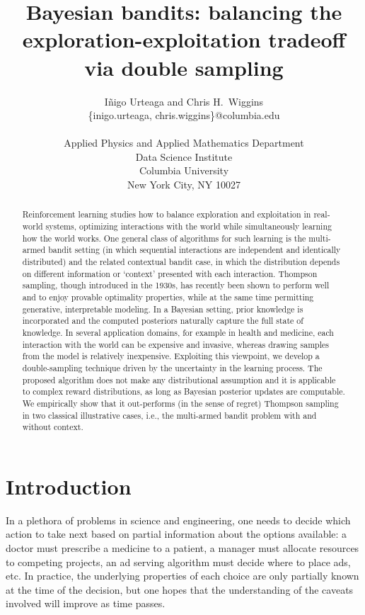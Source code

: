 \documentclass[10pt]{article}
\title{Bayesian bandits: balancing the exploration-exploitation tradeoff via double sampling}
\author{ I\~{n}igo Urteaga and Chris H.~Wiggins\\
	{\sf \{inigo.urteaga, chris.wiggins\}@columbia.edu} \\\\
	Applied Physics and Applied Mathematics Department\\
	Data Science Institute\\
	Columbia University\\
	New York City, NY 10027
}
\newcommand{\ie}{i.e., }
\begin{document}
\maketitle

\begin{abstract}
Reinforcement learning studies how to balance exploration and exploitation in real-world systems, optimizing interactions with the world while simultaneously learning how the world works. One general class of algorithms for such learning is the multi-armed bandit setting (in which sequential interactions are independent and identically distributed) and the related contextual bandit case, in which the distribution depends on different information or `context' presented with each interaction. Thompson sampling, though introduced in the 1930s, has recently been shown to perform well and to enjoy provable optimality properties, while at the same time permitting generative, interpretable modeling. In a Bayesian setting, prior knowledge is incorporated and the computed posteriors naturally capture the full state of knowledge. In several application domains, for example in health and medicine, each interaction with the world can be expensive and invasive, whereas drawing samples from the model is relatively inexpensive. Exploiting this viewpoint, we develop a double-sampling technique driven by the uncertainty in the learning process. The proposed algorithm does not make any distributional assumption and it is applicable to complex reward distributions, as long as Bayesian posterior updates are computable. We empirically show that it out-performs (in the sense of regret) Thompson sampling in two classical illustrative cases, \ie the multi-armed bandit problem with and without context.
\end{abstract}

\section{Introduction}
\label{sec:introduction}

In a plethora of problems in science and engineering, one needs to decide which action to take next based on partial information about the options available: a doctor must prescribe a medicine to a patient, a manager must allocate resources to competing projects, an ad serving algorithm must decide where to place ads, etc. In practice, the underlying properties of each choice are only partially known at the time of the decision, but one hopes that the understanding of the caveats involved will improve as time passes.
\end{document}
